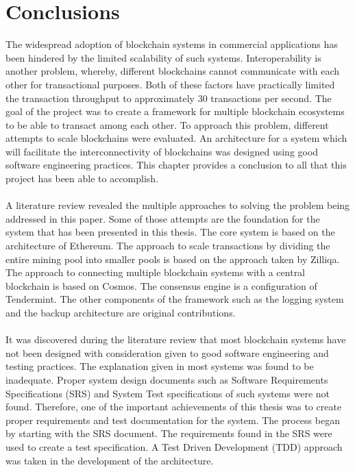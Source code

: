 \documentclass[a4paper,twoside,phd]{BYUPhys}
\begin{document}
\chapter{Conclusions}
The widespread adoption of blockchain systems in commercial applications has been hindered by the limited scalability of such systems\cite{}. Interoperability is another problem, whereby, different blockchains cannot communicate with each other for transactional purposes\cite{}. Both of these factors have practically limited the transaction throughput to approximately 30 transactions per second. The goal of the project was to create a framework for multiple blockchain ecosystems to be able to transact among each other. To approach this problem, different attempts to scale blockchains were evaluated. An architecture for a system which will facilitate the interconnectivity of blockchains was designed using good software engineering practices. This chapter provides a conclusion to all that this project has been able to accomplish.  
\\
\\
A literature review revealed the multiple approaches to solving the problem being addressed in this paper. Some of those attempts are the foundation for the system that has been presented in this thesis. The core system is based on the architecture of Ethereum. The approach to scale transactions by dividing the entire mining pool into smaller pools is based on the approach taken by Zilliqa. The approach to connecting multiple blockchain systems with a central blockchain is based on Cosmos. The consensus engine is a configuration of Tendermint. The other components of the framework such as the logging system and the backup architecture are original contributions.
\\
\\
It was discovered during the literature review that most blockchain systems have not been designed with consideration given to good software engineering and testing practices. The explanation given in most systems was found to be inadequate. Proper system design documents such as Software Requirements Specifications (SRS) and System Test specifications of such systems were not found. Therefore, one of the important achievements of this thesis was to create proper requirements and test documentation for the system. The process began by starting with the SRS document. The requirements found in the SRS were used to create a test specification.  A Test Driven Development (TDD) approach was taken in the development of the architecture.
\end{document}
